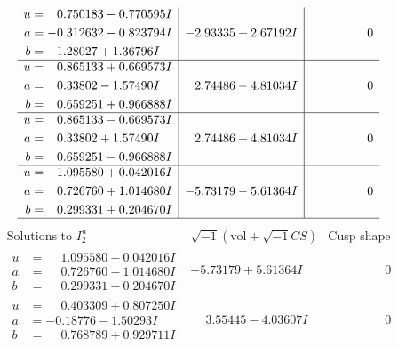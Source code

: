 \documentclass[1p]{elsarticle_modified}
\theoremstyle{definition}
\newcommand{\I}{\sqrt{-1}}
\begin{document}
$$\begin{array}{c|c|c}
\begin{aligned}
u &= \phantom{-}0.750183 - 0.770595 I \\
a &= -0.312632 - 0.823794 I \\
b &= -1.28027 + 1.36796 I\end{aligned}
 & -2.93335 + 2.67192 I & \phantom{-0.000000 } 0 \\ \hline\begin{aligned}
u &= \phantom{-}0.865133 + 0.669573 I \\
a &= \phantom{-}0.33802 - 1.57490 I \\
b &= \phantom{-}0.659251 + 0.966888 I\end{aligned}
 & \phantom{-}2.74486 - 4.81034 I & \phantom{-0.000000 } 0 \\ \hline\begin{aligned}
u &= \phantom{-}0.865133 - 0.669573 I \\
a &= \phantom{-}0.33802 + 1.57490 I \\
b &= \phantom{-}0.659251 - 0.966888 I\end{aligned}
 & \phantom{-}2.74486 + 4.81034 I & \phantom{-0.000000 } 0 \\ \hline\begin{aligned}
u &= \phantom{-}1.095580 + 0.042016 I \\
a &= \phantom{-}0.726760 + 1.014680 I \\
b &= \phantom{-}0.299331 + 0.204670 I\end{aligned}
 & -5.73179 - 5.61364 I & \phantom{-0.000000 } 0\\
 \hline 
 \end{array}$$\newpage$$\begin{array}{c|c|c}  
\text{Solutions to }I^u_{2}& \I (\text{vol} + \sqrt{-1}CS) & \text{Cusp shape}\\
 \hline 
\begin{aligned}
u &= \phantom{-}1.095580 - 0.042016 I \\
a &= \phantom{-}0.726760 - 1.014680 I \\
b &= \phantom{-}0.299331 - 0.204670 I\end{aligned}
 & -5.73179 + 5.61364 I & \phantom{-0.000000 } 0 \\ \hline\begin{aligned}
u &= \phantom{-}0.403309 + 0.807250 I \\
a &= -0.18776 - 1.50293 I \\
b &= \phantom{-}0.768789 + 0.929711 I\end{aligned}
 & \phantom{-}3.55445 - 4.03607 I & \phantom{-0.000000 } 0 \\ \hline\begin{aligned}

\end{aligned}
\end{array}$$
\end{document}
